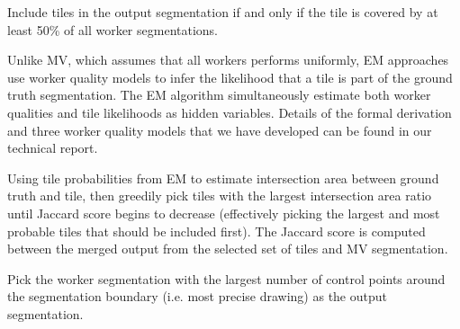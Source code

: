 \par \noindent Include tiles in the output segmentation if and only if the tile is covered by at least 50\% of all worker segmentations.

\par \noindent Unlike MV, which assumes that all workers performs uniformly, EM approaches use worker quality models to infer the likelihood that a tile is part of the ground truth segmentation. The EM algorithm simultaneously estimate both worker qualities and tile likelihoods as hidden variables. Details of the formal derivation and three worker quality models that we have developed can be found in our technical report.

\par \noindent Using tile probabilities from EM to estimate intersection area between ground truth and tile, then greedily pick tiles with the largest intersection area ratio until Jaccard score begins to decrease (effectively picking the largest and most probable tiles that should be included first). The Jaccard score is computed between the merged output from the selected set of tiles and MV segmentation.

\par \noindent Pick the worker segmentation with the largest number of control points around the segmentation boundary (i.e. most precise drawing) as the output segmentation.

